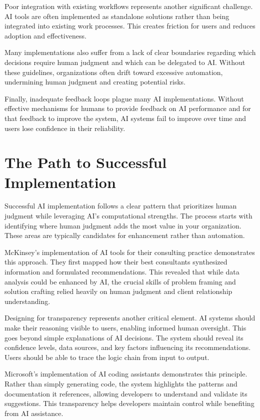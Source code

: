 \documentclass[
  Letterpaper,
]{scrbook}
\begin{document}
Poor integration with existing workflows represents another significant
challenge. AI tools are often implemented as standalone solutions rather
than being integrated into existing work processes. This creates
friction for users and reduces adoption and effectiveness.

Many implementations also suffer from a lack of clear boundaries
regarding which decisions require human judgment and which can be
delegated to AI. Without these guidelines, organizations often drift
toward excessive automation, undermining human judgment and creating
potential risks.

Finally, inadequate feedback loops
plague many AI implementations. Without effective mechanisms for humans
to provide feedback on AI performance and for that feedback to improve
the system, AI systems fail to improve over time and users lose
confidence in their reliability.

\section{The Path to Successful
Implementation}\label{the-path-to-successful-implementation}

Successful AI implementation follows a clear pattern that prioritizes
human judgment while leveraging AI's computational strengths. The
process starts with identifying where human judgment adds the most value
in your organization. These areas are typically candidates for
enhancement rather than automation.

McKinsey's implementation of AI tools for their consulting practice
demonstrates this approach. They first mapped how their best consultants
synthesized information and formulated recommendations. This revealed
that while data analysis could be enhanced by AI, the crucial skills of
problem framing and solution crafting relied heavily on human judgment
and client relationship understanding.

Designing for transparency represents another critical element. AI
systems should make their reasoning visible to users, enabling informed
human oversight. This goes beyond simple explanations of AI decisions.
The system should reveal its confidence levels, data sources, and key
factors influencing its recommendations. Users should be able to trace
the logic chain from input to output.

Microsoft's implementation of AI coding assistants demonstrates this
principle. Rather than simply generating code, the system highlights the
patterns and documentation it references, allowing developers to
understand and validate its suggestions. This transparency helps
developers maintain control while benefiting from AI assistance.
\end{document}

